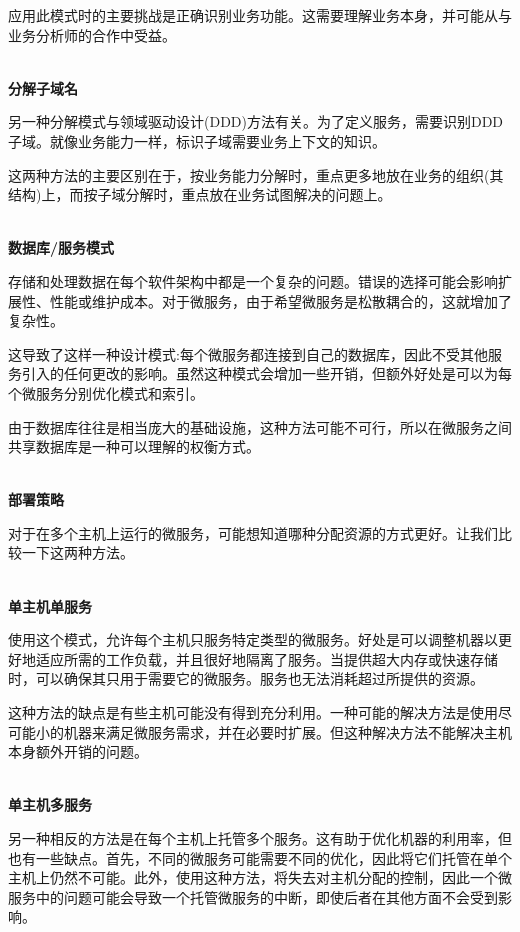 应用此模式时的主要挑战是正确识别业务功能。这需要理解业务本身，并可能从与业务分析师的合作中受益。

\hspace*{\fill} \\ %
\noindent
\textbf{分解子域名}

另一种分解模式与领域驱动设计(DDD)方法有关。为了定义服务，需要识别DDD子域。就像业务能力一样，标识子域需要业务上下文的知识。

这两种方法的主要区别在于，按业务能力分解时，重点更多地放在业务的组织(其结构)上，而按子域分解时，重点放在业务试图解决的问题上。

\hspace*{\fill} \\ %
\noindent
\textbf{数据库/服务模式}

存储和处理数据在每个软件架构中都是一个复杂的问题。错误的选择可能会影响扩展性、性能或维护成本。对于微服务，由于希望微服务是松散耦合的，这就增加了复杂性。

这导致了这样一种设计模式:每个微服务都连接到自己的数据库，因此不受其他服务引入的任何更改的影响。虽然这种模式会增加一些开销，但额外好处是可以为每个微服务分别优化模式和索引。

由于数据库往往是相当庞大的基础设施，这种方法可能不可行，所以在微服务之间共享数据库是一种可以理解的权衡方式。

\hspace*{\fill} \\ %
\noindent
\textbf{部署策略}

对于在多个主机上运行的微服务，可能想知道哪种分配资源的方式更好。让我们比较一下这两种方法。

\hspace*{\fill} \\ %
\noindent
\textbf{单主机单服务}

使用这个模式，允许每个主机只服务特定类型的微服务。好处是可以调整机器以更好地适应所需的工作负载，并且很好地隔离了服务。当提供超大内存或快速存储时，可以确保其只用于需要它的微服务。服务也无法消耗超过所提供的资源。

这种方法的缺点是有些主机可能没有得到充分利用。一种可能的解决方法是使用尽可能小的机器来满足微服务需求，并在必要时扩展。但这种解决方法不能解决主机本身额外开销的问题。

\hspace*{\fill} \\ %
\noindent
\textbf{单主机多服务}

另一种相反的方法是在每个主机上托管多个服务。这有助于优化机器的利用率，但也有一些缺点。首先，不同的微服务可能需要不同的优化，因此将它们托管在单个主机上仍然不可能。此外，使用这种方法，将失去对主机分配的控制，因此一个微服务中的问题可能会导致一个托管微服务的中断，即使后者在其他方面不会受到影响。

